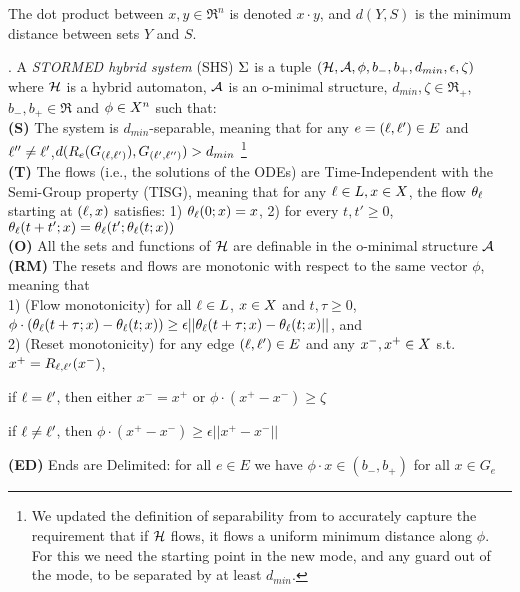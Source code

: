 %
The dot product between $x,y\in \Re^n$ is denoted $x \cdot y$, and $d(Y,S)$ is the minimum distance between sets $Y$ and $S$.
\begin{defn}\cite{VladimerouPVD08_STORMED}.
	\label{defn:stormed system}	
	A \emph{STORMED hybrid system} (SHS) $\Sigma$ is a tuple $(\mathcal{H},\mathcal{A}, \phi,b_-,b_+, d_{min}, \epsilon,\zeta)$ where $\mathcal{H}$ is a hybrid automaton, $\mathcal{A}$ is an o-minimal structure, $d_{min}, \zeta \in \Re_+$, $b_-,b_+ \in \Re$ and $\phi \in X^n$ such that:
	\\
	\textbf{(S)} The system is $d_{min}$-separable, meaning that for any $e=(\ell, \ell ')\in E$ and $\ell ''\neq \ell'$,$d(R_e(G_{(\ell ,\ell ')}), G_{(\ell' ,\ell '')})>d_{min}$
	\footnote{We updated the definition of separability from \cite{VladimerouPVD08_STORMED} to accurately capture the requirement that if $\mathcal{H}$ flows, it flows a uniform minimum distance along $\phi$. For this we need the starting point in the new mode, and any guard out of the mode, to be separated by at least $d_{min}$.}
	\\
	\textbf{(T)} The flows (i.e., the solutions of the ODEs) are Time-Independent with the Semi-Group property (TISG), meaning that for any $\ell \in L, x \in X$, the flow $\theta_\ell$ starting at $(\ell , x)$ satisfies: 1) $\theta_{\ell}(0;x) = x$, 2) for every $t,t' \geq 0$, $\theta_{\ell}(t+t';x) = \theta_{\ell}(t'; \theta_\ell(t;x))$
	\\
	\textbf{(O)} All the sets and functions of $\mathcal{H}$ are definable in the o-minimal structure $\mathcal{A}$
	\\
	\textbf{(RM)} The resets and flows are monotonic with respect to the same vector $\phi$, meaning that \\
	1) (Flow monotonicity) for all $\ell \in L$, $x \in X$ and $t,\tau \geq 0$, $\phi \cdot (\theta_\ell (t+\tau;x) - \theta_\ell (t;x) ) \geq \epsilon ||\theta_\ell (t+\tau;x) - \theta_\ell (t;x) ||$, 
	and \\
	2) (Reset monotonicity) for any edge $(\ell,\ell') \in E$ and any $x^-,x^+ \in X$ s.t. $x^+ = R_{\ell ,\ell'}(x^-)$, 
	\begin{compactenum}
		\item if $\ell = \ell'$, then either $x^-=x^+$ or $\phi \cdot (x^+-x^-)\geq \zeta$
		\item if $\ell \neq \ell'$, then $\phi\cdot (x^+-x^-) \geq \epsilon ||x^+-x^-||$
	\end{compactenum}

	\textbf{(ED)} Ends are Delimited: for all $e \in E$ we have $\phi \cdot x \in (b_- , b_+)$ for all $x \in G_{e}$
\end{defn}
